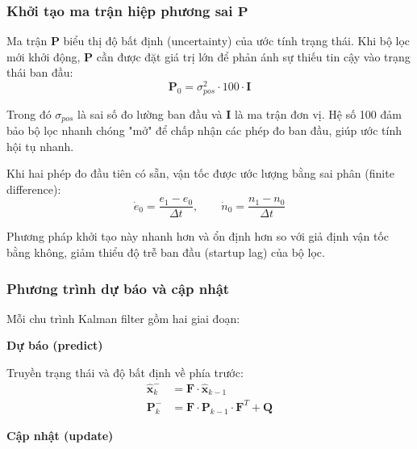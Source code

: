 \subsubsection{Khởi tạo ma trận hiệp phương sai \texorpdfstring{$\mathbf{P}$}{P}}

\hspace{0.5cm} Ma trận $\mathbf{P}$ biểu thị độ bất định (uncertainty) của ước tính trạng thái. Khi bộ lọc mới khởi động, $\mathbf{P}$ cần được đặt giá trị lớn để phản ánh sự thiếu tin cậy vào trạng thái ban đầu:
\begin{equation}
    \mathbf{P}_0 = \sigma_{pos}^2 \cdot 100 \cdot \mathbf{I}
\end{equation}

Trong đó $\sigma_{pos}$ là sai số đo lường ban đầu và $\mathbf{I}$ là ma trận đơn vị. Hệ số 100 đảm bảo bộ lọc nhanh chóng "mở" để chấp nhận các phép đo ban đầu, giúp ước tính hội tụ nhanh.

Khi hai phép đo đầu tiên có sẵn, vận tốc được ước lượng bằng sai phân (finite difference):
\begin{equation}
    \dot{e}_0 = \frac{e_1 - e_0}{\Delta t}, \qquad \dot{n}_0 = \frac{n_1 - n_0}{\Delta t}
\end{equation}

Phương pháp khởi tạo này nhanh hơn và ổn định hơn so với giả định vận tốc bằng không, giảm thiểu độ trễ ban đầu (startup lag) của bộ lọc.

\subsubsection{Phương trình dự báo và cập nhật}

\hspace{0.5cm} Mỗi chu trình Kalman filter gồm hai giai đoạn:

\textbf{Dự báo (predict)}

Truyền trạng thái và độ bất định về phía trước:
\begin{equation}
\begin{aligned}
    \hat{\mathbf{x}}_k^- &= \mathbf{F} \cdot \hat{\mathbf{x}}_{k-1} \\
    \mathbf{P}_k^- &= \mathbf{F} \cdot \mathbf{P}_{k-1} \cdot \mathbf{F}^T + \mathbf{Q}
\end{aligned}
\end{equation}

\textbf{Cập nhật (update)}

